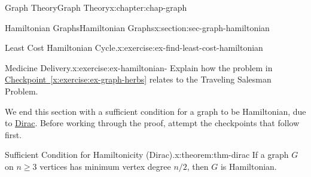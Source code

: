 \documentclass[oneside,10pt,]{book}
\newcommand{\xreffont}{\relax}
\numberwithin{equation}{section}
\begin{document}
\begin{chapterptx}{Graph Theory}{}{Graph Theory}{}{}{x:chapter:chap-graph}
\begin{sectionptx}{Hamiltonian Graphs}{}{Hamiltonian Graphs}{}{}{x:section:sec-graph-hamiltonian}
\begin{inlineexercise}{Least Cost Hamiltonian Cycle.}{x:exercise:ex-find-least-cost-hamiltonian}
\begin{sidebyside}{1}{0.35}{0.35}{0}
\begin{sbspanel}{0.3}
{
}%
\end{sbspanel}%
\end{sidebyside}%
\end{inlineexercise}%
\begin{inlineexercise}{Medicine Delivery.}{x:exercise:ex-hamiltonian-}%
Explain how the problem in \hyperref[x:exercise:ex-graph-herbs]{Checkpoint~{\xreffont\ref{x:exercise:ex-graph-herbs}}} relates to the Traveling Salesman Problem.%
\end{inlineexercise}%
We end this section with a sufficient condition for a graph to be Hamiltonian, due to \href{https://en.wikipedia.org/wiki/Gabriel_Andrew_Dirac}{Dirac}. Before working through the proof, attempt the checkpoints that follow first.%
\begin{theorem}{Sufficient Condition for Hamiltonicity (Dirac).}{}{x:theorem:thm-dirac}%
If a graph \(G\) on \(n \geq 3\) vertices has minimum vertex degree \(n/2\), then \(G\) is Hamiltonian.%

\end{theorem}
\end{sectionptx}
\end{chapterptx}
\end{document}
